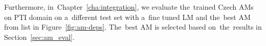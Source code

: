 Furthermore, in~Chapter~\ref{cha:integration}, we evaluate the~trained Czech \acp{AM} on \acl{PTI} domain on a~different test set with a~fine tuned \ac{LM} and the~best \ac{AM} from list in Figure~\ref{fig:am-deps}.
The~best \ac{AM} is selected based on~the~results in Section~\ref{sec:am_eval}.




% 

